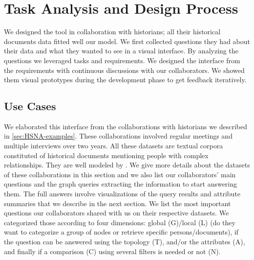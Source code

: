 \section{Task Analysis and Design Process}\label{sec:tasks}

We designed the \name tool in collaboration with historians; all their historical documents data fitted well our \model model.
We first collected questions they had about their data and what they wanted to see in a visual interface.
By analyzing the questions we leveraged tasks and requirements.
We designed the interface from the requirements with continuous discussions with our collaborators.
We showed them visual prototypes during the development phase to get feedback iteratively.

\subsection{Use Cases}

We elaborated this interface from the collaborations with historians we described in \autoref{sec:HSNA-examples}.
These collaborations involved regular meetings and multiple interviews over two years.
All these datasets are textual corpora constituted of historical documents mentioning people with complex relationships.
They are well modeled by \model.
We give more details about the datasets of these collaborations in this section and we also list our collaborators' main questions and the graph queries extracting the information to start answering them.
The full answers involve visualizations of the query results and attribute summaries that we describe in the next section.
We list the most important questions our collaborators shared with us on their respective datasets.
We categorized those according to four dimensions: global (G)/local (L) (do they want to categorize a group of nodes or retrieve specific persons/documents), if the question can be answered using the topology (T), and/or the attributes (A), and finally if a comparison (C) using several filters is needed or not (N).

